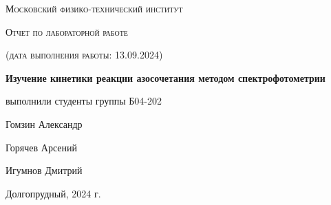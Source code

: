 \documentclass[a4paper]{article}
\begin{document}
\begin{titlepage}
	\centering
	\vspace{5cm}
	{\scshape\LARGE Московский физико-технический институт \par}
	\vspace{4cm}
	{\scshape\Large Отчет по лабораторной работе \par}
        {\scshape\large (дата выполнения работы: 13.09.2024) \par}
	\vspace{1cm}
	{\huge\bfseries Изучение кинетики реакции азосочетания методом спектрофотометрии \par}
	\vspace{1cm}
	\vfill
\begin{flushright}
	{\large выполнили студенты группы Б04-202}\par
	\vspace{0.3cm}
	{\LARGE Гомзин Александр} \par
		\vspace{0.3cm}
	{\LARGE Горячев Арсений} \par
        \vspace{0.3cm}
        {\LARGE Игумнов Дмитрий} \par
\end{flushright}
	

	\vfill

	Долгопрудный, 2024 г.
\end{titlepage}

	\thispagestyle{empty}


	\newpage \LARGE
	
		\tableofcontents %
	
	\newpage
\par
\end{document}
